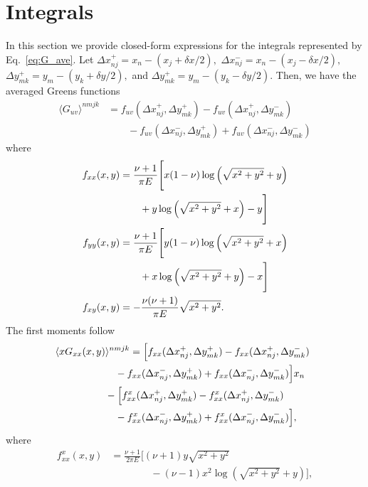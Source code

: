 \documentclass[aps,prl,reprint,twocolumn,groupedaddress,showpacs]{revtex4-1}
\begin{document}
\section{Integrals }
In this section we provide closed-form expressions for the integrals represented by Eq.~\ref{eq:G_ave}.
Let $\Delta x_{nj}^+ = x_n - (x_j+\delta x/2),$ $\Delta x_{nj}^- = x_n - (x_j-\delta x/2),$ $\Delta y_{mk}^+ = y_m - (y_k+\delta y/2),$ and $\Delta y_{mk}^+ = y_m - (y_k-\delta y/2).$ Then,
we have the averaged Greens functions
\begin{align}
\langle G_{uv}\rangle^{nmjk} &=   f_{uv}( \Delta x_{nj}^+,\Delta y_{mk}^+) - f_{uv}( \Delta x_{nj}^+,\Delta y_{mk}^-)  \nonumber \\
&\qquad -f_{uv}(\Delta x_{nj}^-, \Delta y_{mk}^+) + f_{uv}(\Delta x_{nj}^- , \Delta y_{mk}^-)
\end{align}
where
\begin{align}\allowdisplaybreaks
f_{xx}(x,y) &= \frac{\nu+1}{\pi E}\Bigg[ x(1-\nu ) \log\left( \sqrt{x^2+y^2}+y\right) \nonumber\\
&\qquad+ y \log\left(\sqrt{x^2+y^2} +x\right)-y  \Bigg] \label{eq:fxx} \\
f_{yy}(x,y) &= \frac{\nu+1}{\pi E}\Bigg[ y(1-\nu ) \log\left( \sqrt{x^2+y^2}+x\right) \nonumber\\
&\qquad+ x \log\left(\sqrt{x^2+y^2} +y\right)-x  \Bigg] \label{eq:fyy} \\
f_{xy}(x,y) &= -\frac{\nu(\nu+1)}{\pi E}\sqrt{x^2+y^2}. \label{eq:fxy}
\end{align}
The first moments follow
\begin{align}
\lefteqn{\langle xG_{xx}(x,y) \rangle^{nmjk} =\Big[ f_{xx}( \Delta x_{nj}^+,\Delta y_{mk}^+)- f_{xx}( \Delta x_{nj}^+,\Delta y_{mk}^-)}\nonumber\\
 &\qquad\qquad\qquad   -f_{xx}(\Delta x_{nj}^-, \Delta y_{mk}^+)+ f_{xx}(\Delta x_{nj}^- , \Delta y_{mk}^-)\Big] x_n\nonumber\\
 &\quad\qquad\qquad   - \Big[ f^x_{xx}( \Delta x_{nj}^+ , \Delta y_{mk}^+)- f^x_{xx}( \Delta x_{nj}^+ , \Delta y_{mk}^-) \nonumber\\
 &\qquad\qquad\qquad-f^x_{xx}(\Delta x_{nj}^-, \Delta y_{mk}^+) + f^x_{xx}(\Delta x_{nj}^- , \Delta y_{mk}^-)\Big],
\end{align}
where
\begin{align}
f^x_{xx}(x,y) &= \frac{\nu+1}{2\pi E} \Big[ (\nu+1)y\sqrt{x^2 + y^2} \nonumber\\
&\qquad\qquad- (\nu-1) x^2\log\left(\sqrt{x^2 + y^2} +y  \right)  \Big],\label{eq:fxxx}
\end{align}
\end{document}
